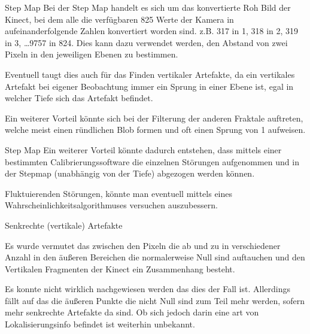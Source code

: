 \documentclass{VLKlauck}
\begin{document}
\begin{frame}{Step Map}
	Bei der Step Map handelt es sich um das konvertierte Roh Bild der Kinect, bei
	dem alle die verfügbaren 825 Werte der Kamera in aufeinanderfolgende Zahlen
	konvertiert worden sind. z.B.  317 in 1, 318 in 2, 319 in 3, \ldots 9757 in
	824.
	Dies kann dazu verwendet werden, den Abstand von zwei Pixeln in den
	jeweiligen Ebenen zu bestimmen.
	
	Eventuell taugt dies auch für das Finden vertikaler Artefakte, da ein
	vertikales Artefakt bei eigener Beobachtung immer ein Sprung in einer Ebene
	ist, egal in welcher Tiefe sich das Artefakt befindet.
	
	Ein weiterer Vorteil könnte sich bei der Filterung der anderen Fraktale
	auftreten, welche meist einen ründlichen Blob formen und oft einen Sprung von 1
	aufweisen.
\end{frame}


\begin{frame}{Step Map}
	Ein weiterer Vorteil könnte dadurch entstehen, dass mittels einer bestimmten 
	Calibrierungssoftware die einzelnen Störungen aufgenommen und in der Stepmap
	(unabhängig von der Tiefe) abgezogen werden können.
	
	Fluktuierenden Störungen, könnte man eventuell mittels eines
	Wahrscheinlichkeitsalgorithmuses versuchen auszubessern.
\end{frame}
	 
\begin{frame}{Senkrechte (vertikale) Artefakte}
	
	Es wurde vermutet das zwischen den Pixeln die ab und zu in verschiedener Anzahl
	in den äußeren Bereichen die normalerweise Null sind auftauchen und den
	Vertikalen Fragmenten der Kinect ein Zusammenhang besteht.
	
	Es konnte nicht wirklich nachgewiesen werden das dies der Fall ist.
	Allerdings fällt auf das die äußeren Punkte die nicht Null sind zum Teil mehr
	werden, sofern mehr senkrechte Artefakte da sind. Ob sich jedoch darin eine
	art von Lokalisierungsinfo befindet ist weiterhin unbekannt.
\end {frame}	 
	  
\end{document}
